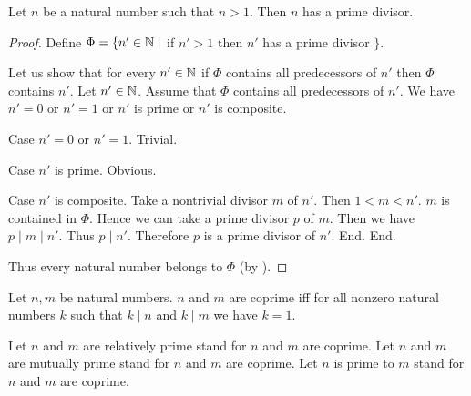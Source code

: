\documentclass[10pt]{article}
\begin{document}
  \begin{forthel}
    \begin{proposition}
      Let $n$ be a natural number such that $n > 1$.
      Then $n$ has a prime divisor.
    \end{proposition}
    \begin{proof}
      Define $\Phi = \{ n' \in \mathbb{N} \mid$ if $n' > 1$ then $n'$ has a prime divisor $\}$.

      Let us show that for every $n' \in \mathbb{N}$ if $\Phi$ contains all
      predecessors of $n'$ then $\Phi$ contains $n'$.
        Let $n' \in \mathbb{N}$.
        Assume that $\Phi$ contains all predecessors of $n'$.
        We have $n' = 0$ or $n' = 1$ or $n'$ is prime or $n'$ is composite.

        Case $n' = 0$ or $n' = 1$. Trivial.

        Case $n'$ is prime. Obvious.

        Case $n'$ is composite.
          Take a nontrivial divisor $m$ of $n'$.
          Then $1 < m < n'$.
          $m$ is contained in $\Phi$.
          Hence we can take a prime divisor $p$ of $m$.
          Then we have $p \mid m \mid n'$.
          Thus $p \mid n'$.
          Therefore $p$ is a prime divisor of $n'$.
        End.
      End.

      Thus every natural number belongs to $\Phi$ (by ).
    \end{proof}
  \end{forthel}

  \begin{forthel}
    \begin{definition}
      Let $n, m$ be natural numbers.
      $n$ and $m$ are coprime iff for all nonzero natural numbers $k$ such that $k \mid n$ and $k \mid m$ we have $k = 1$.
    \end{definition}

    Let $n$ and $m$ are relatively prime stand for $n$ and $m$ are coprime.
    Let $n$ and $m$ are mutually prime stand for $n$ and $m$ are coprime.
    Let $n$ is prime to $m$ stand for $n$ and $m$ are coprime.
  \end{forthel}
\end{document}
